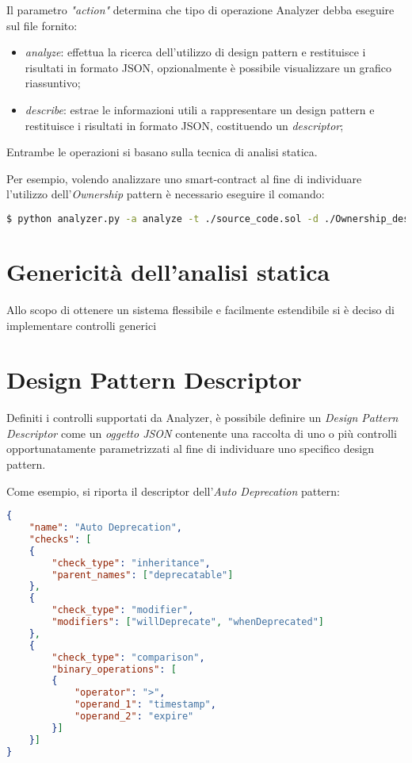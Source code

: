 \noindent Il parametro \textit{"action"} determina che tipo di operazione Analyzer debba eseguire sul file fornito:
\begin{itemize}
	\item \textit{analyze}: effettua la ricerca dell'utilizzo di design pattern e restituisce i risultati in formato JSON, opzionalmente è possibile visualizzare un grafico riassuntivo;
	\item \textit{describe}: estrae le informazioni utili a rappresentare un design pattern e restituisce i risultati in formato JSON, costituendo un \textit{descriptor};
\end{itemize}
Entrambe le operazioni si basano sulla tecnica di analisi statica.\par
Per esempio, volendo analizzare uno smart-contract al fine di individuare l'utilizzo dell'\textit{Ownership} pattern è necessario eseguire il comando:
\begin{lstlisting}[language=bash]
	$ python analyzer.py -a analyze -t ./source_code.sol -d ./Ownership_descriptor.json
\end{lstlisting}

\section{Genericità dell'analisi statica}
Allo scopo di ottenere un sistema flessibile e facilmente estendibile si è deciso di implementare controlli generici  

\section{Design Pattern Descriptor}
Definiti i controlli supportati da Analyzer, è possibile definire un \textit{Design Pattern Descriptor} come un \textit{oggetto JSON} contenente una raccolta di uno o più controlli opportunatamente parametrizzati al fine di individuare uno specifico design pattern.\par
Come esempio, si riporta il descriptor dell'\textit{Auto Deprecation} pattern:
	{\begin{lstlisting}[language=json, caption={Auto Deprecation Descriptor}]
{
	"name": "Auto Deprecation",
	"checks": [
	{
		"check_type": "inheritance",
		"parent_names": ["deprecatable"]
	},
	{
		"check_type": "modifier",
		"modifiers": ["willDeprecate", "whenDeprecated"]
	},
	{
		"check_type": "comparison",
		"binary_operations": [
		{
			"operator": ">",
			"operand_1": "timestamp",
			"operand_2": "expire"
		}]
	}]
}\end{lstlisting}}
